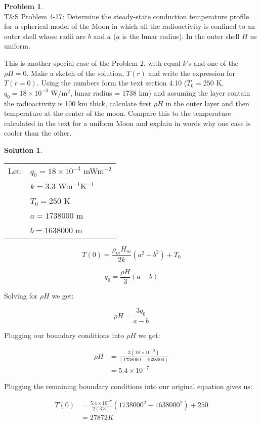 \documentclass[titlepage, 11pt]{article}
\theoremstyle{definition}
\newtheorem{problem}{Problem}
\newtheorem*{solution}{Solution}
\begin{document}
\newpage

\begin{problem}\ \\
T\&S Problem 4-17: Determine the steady-state conduction temperature profile for a spherical model of the Moon in which all the radioactivity is confined to an outer shell whose radii are $b$ and $a$ ($a$ is the lunar radius). In the outer shell $H$ us uniform.\vspace{\baselineskip}

\noindent
This is another special case of the Problem 2, with equal $k$'s and one of the $\rho H = 0$. Make a sketch of the solution, $T(r)$ and write the expression for $T(r = 0)$. Using the numbers form the text section 4.10 ($T_0 = 250$ K, $q_0 = 18\times{10}^{-3}$ W/m$^{2}$, lunar radius = 1738 km) and assuming the layer contain the radioactivity is 100 km thick, calculate first $\rho H$ in the outer layer and then temperature at the center of the moon. Compare this to the temperature calculated in the text for a uniform Moon and explain in words why one case is cooler than the other.
\end{problem}

\begin{solution}\ \\

\begin{tabular}{ll}
Let: & $q_{0}=18\times 10^{-3}$     mWm$^{-2}$\\
     & $k=3.3$                    Wm$^{-1}$K$^{-1}$\\
     & $T_{0}=250$                K\\ 
     & $a = 1738000$              m\\
     & $b = 1638000$              m
\end{tabular}\vspace{\baselineskip}

$$T(0) = \frac{\rho_m H_m}{2k}(a^2 - b^2) +T_0$$

$$q_0 = \frac{\rho H}{3}(a-b)$$

Solving for $\rho H$ we get:

$$\rho H = \frac{3q_0}{a-b}$$

Plugging our boundary conditions into $\rho H$ we get:

\begin{align*}
    \rho H & = \frac{3(18 \times 10^{-3})}{(1738000 - 1638000)}\\
    & = 5.4 \times 10^{-7}
\end{align*}

Plugging the remaining boundary conditions into our original equation gives us:

\begin{align*}
    T(0) & = \frac{5.4\times 10^{-7}}{2(3.3)}\left( 1738000^2 - 1638000^2 \right) + 250\\
    & = \boxed{27872 K}
\end{align*}

\end{solution}
\end{document}
